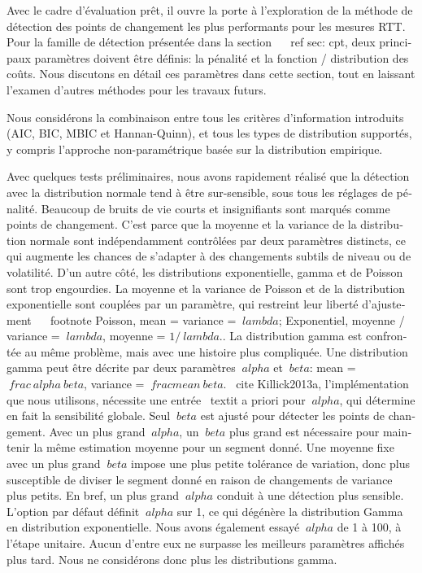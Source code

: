\begin{otherlanguage}{french}
{Avec le cadre d'évaluation prêt, il ouvre la porte à l'exploration de la méthode de détection des points de changement les plus performants pour les mesures RTT.
Pour la famille de détection présentée dans la section ~ \ ref {sec: cpt}, deux principaux paramètres doivent être définis: la pénalité et la fonction / distribution des coûts.
Nous discutons en détail ces paramètres dans cette section, tout en laissant l'examen d'autres méthodes pour les travaux futurs.

Nous considérons la combinaison entre tous les critères d'information introduits (AIC, BIC, MBIC et Hannan-Quinn), et tous les types de distribution supportés, y compris l'approche non-paramétrique basée sur la distribution empirique.

Avec quelques tests préliminaires, nous avons rapidement réalisé que la détection avec la distribution normale tend à être sur-sensible, sous tous les réglages de pénalité.
Beaucoup de bruits de vie courts et insignifiants sont marqués comme points de changement.
C'est parce que la moyenne et la variance de la distribution normale sont indépendamment contrôlées par deux paramètres distincts, ce qui augmente les chances de s'adapter à des changements subtils de niveau ou de volatilité.
D'un autre côté, les distributions exponentielle, gamma et de Poisson sont trop engourdies.
La moyenne et la variance de Poisson et de la distribution exponentielle sont couplées par un paramètre,
qui restreint leur liberté d'ajustement ~ \ footnote {Poisson, mean = variance = $ \ lambda $; Exponentiel, moyenne / variance = $ \ lambda $, moyenne = $ 1 / \ lambda $.}.
La distribution gamma est confrontée au même problème, mais avec une histoire plus compliquée.
Une distribution gamma peut être décrite par deux paramètres $ \ alpha $ et $ \ beta $: mean = $ \ frac {\ alpha} {\ beta} $, variance = $ \ frac {mean} {\ beta} $.
\ cite {Killick2013a}, l'implémentation que nous utilisons, nécessite une entrée \ textit {a priori} pour $ \ alpha $, qui détermine en fait la sensibilité globale.
Seul $ \ beta $ est ajusté pour détecter les points de changement.
Avec un plus grand $ \ alpha $, un $ \ beta $ plus grand est nécessaire pour maintenir la même estimation moyenne pour un segment donné.
Une moyenne fixe avec un plus grand $ \ beta $ impose une plus petite tolérance de variation, donc plus susceptible de diviser le segment donné en raison de changements de variance plus petits.
En bref, un plus grand $ \ alpha $ conduit à une détection plus sensible.
L'option par défaut définit $ \ alpha $ sur 1, ce qui dégénère la distribution Gamma en distribution exponentielle.
Nous avons également essayé $ \ alpha $ de 1 à 100, à l'étape unitaire.
Aucun d'entre eux ne surpasse les meilleurs paramètres affichés plus tard.
Nous ne considérons donc plus les distributions gamma.

}
\end{otherlanguage}
